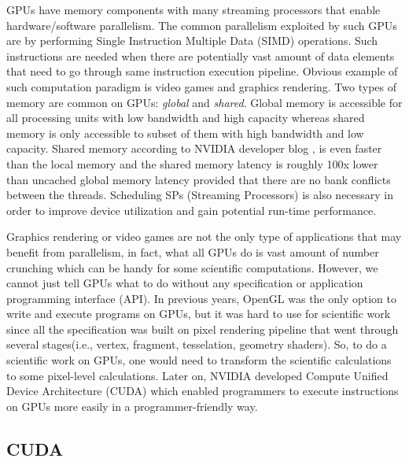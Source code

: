 \documentclass[conference]{IEEEtran}
\begin{document}
GPUs have memory components with many streaming processors that enable hardware/software parallelism. The common parallelism exploited by such GPUs are by performing Single Instruction Multiple Data (SIMD) 
operations. Such instructions are needed when there are potentially vast amount of data elements that need to go through same instruction execution pipeline. Obvious example of such computation paradigm is 
video games and graphics rendering. Two types of memory are common on GPUs: \textit{global} and \textit{shared}. Global memory is accessible for all processing units with low bandwidth and high capacity 
whereas shared memory is only accessible to subset of them with high bandwidth and low capacity. Shared memory according to NVIDIA developer blog \cite{b2}, is even faster than the local memory and the 
shared memory latency is roughly 100x lower than uncached global memory latency provided that there are no bank conflicts between the threads. Scheduling SPs (Streaming Processors) is also necessary in 
order to improve device utilization and gain potential run-time performance.

Graphics rendering or video games are not the only type of applications that may benefit from parallelism, in fact, what all GPUs do is vast amount of number crunching which can be handy for some scientific 
computations. However, we cannot just tell GPUs what to do without any specification or application programming interface (API). In previous years, OpenGL was the only option to write and execute 
programs on GPUs, but it was hard to use for scientific work since all the specification was built on pixel rendering pipeline that went through several stages(i.e., vertex, fragment, tesselation, 
geometry shaders). So, to do a scientific work on GPUs, one would need to transform the scientific calculations to some pixel-level calculations. Later on, NVIDIA developed Compute Unified Device 
Architecture (CUDA) which enabled programmers to execute instructions on GPUs more easily in a programmer-friendly way. 

\subsection{CUDA}
\end{document}
